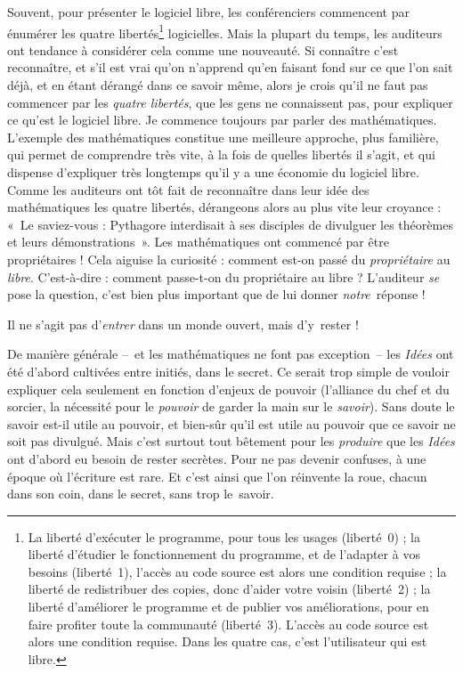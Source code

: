 \documentclass{FramateX}
\begin{document}
\begin{refsection}
Souvent, pour présenter le logiciel libre, les conférenciers commencent
par énumérer les quatre libertés\footnote{La liberté d'exécuter le
programme, pour tous les usages (liberté~0) ; la liberté d'étudier le
fonctionnement du programme, et de l'adapter à vos besoins (liberté~1),
l'accès au  code source est
alors une condition requise ; la liberté de redistribuer des copies,
donc d'aider votre voisin (liberté~2) ; la liberté d'améliorer le
programme et de publier vos améliorations, pour en faire profiter toute
la communauté (liberté~3). L'accès au  code source est alors une condition requise.
Dans les quatre cas, c'est l'utilisateur qui est libre.} logicielles.
Mais la plupart du temps, les auditeurs ont tendance à considérer cela
comme une nouveauté. Si connaître c'est reconnaître, et s'il est vrai
qu'on n'apprend qu'en faisant fond sur ce que l'on sait déjà, et en
étant dérangé dans ce savoir même, alors je crois qu'il ne faut pas
commencer par les \textit{quatre libertés}, que les gens ne connaissent
pas, pour expliquer ce qu'est le logiciel libre. Je commence toujours
par parler des mathématiques. L'exemple des mathématiques constitue une
meilleure approche, plus familière, qui permet de comprendre très vite,
à la fois de quelles libertés il s'agit, et qui dispense d'expliquer
très longtemps qu'il y a une économie du logiciel libre. Comme les
auditeurs ont tôt fait de reconnaître dans leur idée des mathématiques
les quatre libertés, dérangeons alors au plus vite leur croyance : «~Le
saviez-vous : Pythagore interdisait à ses disciples de divulguer les
théorèmes et leurs démonstrations~». Les mathématiques ont commencé par
être propriétaires ! Cela aiguise la curiosité : comment est-on passé
du \textit{propriétaire} au \textit{libre}. C'est-à-dire : comment
passe-t-on du propriétaire au libre ? L'auditeur \textit{se} pose la
question, c'est bien plus important que de lui donner
\textit{notre}~réponse !

Il ne s'agit pas d'\textit{entrer }dans un monde ouvert, mais d'y~rester
!

De manière générale –~et les mathématiques ne font pas exception~– les
\textit{Idées} ont été d'abord cultivées entre initiés, dans le secret.
Ce serait trop simple de vouloir expliquer cela seulement en fonction
d'enjeux de pouvoir (l'alliance du chef et du sorcier, la nécessité
pour le \textit{pouvoir }de garder la main sur le \textit{savoir}).
Sans doute le savoir est-il utile au pouvoir, et bien-sûr qu'il est
utile au pouvoir que ce savoir ne soit pas divulgué. Mais c'est surtout
tout bêtement pour les \textit{produire} que les \textit{Idées} ont
d'abord eu besoin de rester secrètes. Pour ne pas devenir confuses, à
une époque où l'écriture est rare. Et c'est ainsi que l'on réinvente la
roue, chacun dans son coin, dans le secret, sans trop le~savoir.


\end{refsection}
\end{document}
